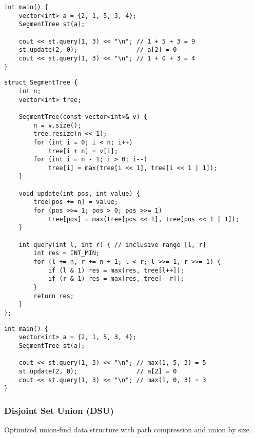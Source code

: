 \documentclass[11pt,a4paper]{article}
\begin{document}
\begin{lstlisting}[caption={Segment Tree Example Usage}]
int main() {
    vector<int> a = {2, 1, 5, 3, 4};
    SegmentTree st(a);

    cout << st.query(1, 3) << "\n"; // 1 + 5 + 3 = 9
    st.update(2, 0);                // a[2] = 0
    cout << st.query(1, 3) << "\n"; // 1 + 0 + 3 = 4
}
\end{lstlisting}

\newpage
\begin{lstlisting}[caption={Segment Tree for Range Maximum}]
struct SegmentTree {
    int n;
    vector<int> tree;

    SegmentTree(const vector<int>& v) {
        n = v.size();
        tree.resize(n << 1);
        for (int i = 0; i < n; i++)
            tree[i + n] = v[i];
        for (int i = n - 1; i > 0; i--)
            tree[i] = max(tree[i << 1], tree[i << 1 | 1]);
    }

    void update(int pos, int value) {
        tree[pos += n] = value;
        for (pos >>= 1; pos > 0; pos >>= 1)
            tree[pos] = max(tree[pos << 1], tree[pos << 1 | 1]);
    }

    int query(int l, int r) { // inclusive range [l, r]
        int res = INT_MIN;
        for (l += n, r += n + 1; l < r; l >>= 1, r >>= 1) {
            if (l & 1) res = max(res, tree[l++]);
            if (r & 1) res = max(res, tree[--r]);
        }
        return res;
    }
};
\end{lstlisting}

\begin{lstlisting}[caption={Segment Tree Max Example Usage}]
int main() {
    vector<int> a = {2, 1, 5, 3, 4};
    SegmentTree st(a);

    cout << st.query(1, 3) << "\n"; // max(1, 5, 3) = 5
    st.update(2, 0);                // a[2] = 0
    cout << st.query(1, 3) << "\n"; // max(1, 0, 3) = 3
}
\end{lstlisting}

\newpage

\subsubsection{Disjoint Set Union (DSU)}
Optimized union-find data structure with path compression and union by size.
\end{document}
